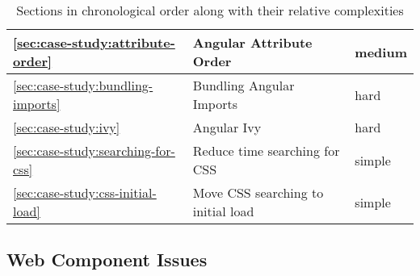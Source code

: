 \begin{table}[h]
\begin{tabularx}{\columnwidth}{l|X|l}
		\ref{sec:case-study:attribute-order}        & Angular Attribute Order            & medium                       \\ \hline
		\ref{sec:case-study:bundling-imports}       & Bundling Angular Imports           & hard                       \\ \hline
		\ref{sec:case-study:ivy}                    & Angular Ivy                        & hard                       \\ \hline
		\ref{sec:case-study:searching-for-css}      & Reduce time searching for CSS      & simple                       \\ \hline
		\ref{sec:case-study:css-initial-load}       & Move CSS searching to initial load & simple                       \\
	\end{tabularx}
	\caption{Sections in chronological order along with their relative complexities}
	\label{tab:case-study:chronological-issues}
\end{table}

\subsection{Web Component Issues}

